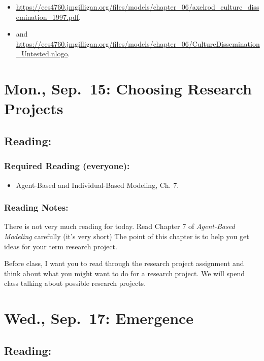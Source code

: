 \documentclass[
]{article}
\providecommand{\tightlist}{%
  \setlength{\itemsep}{0pt}\setlength{\parskip}{0pt}}
\begin{document}
\begin{itemize}
\tightlist
\item
  \url{https://ees4760.jmgilligan.org/files/models/chapter_06/axelrod_culture_dissemination_1997.pdf},
\item
  and
  \url{https://ees4760.jmgilligan.org/files/models/chapter_06/CultureDissemination_Untested.nlogo}.
\end{itemize}

\section{Mon., Sep.~15: Choosing Research
Projects}\label{mon.-sep.-15-choosing-research-projects}

\subsection{Reading:}\label{reading-7}

\subsubsection{Required Reading
(everyone):}\label{required-reading-everyone-6}

\begin{itemize}
\tightlist
\item
  Agent-Based and Individual-Based Modeling, Ch. 7.
\end{itemize}

\subsubsection{Reading Notes:}\label{reading-notes-6}

There is not very much reading for today. Read Chapter 7 of
\emph{Agent-Based Modeling} carefully (it's very short) The point of
this chapter is to help you get ideas for your term research project.

Before class, I want you to read through the research project assignment
and think about what you might want to do for a research project. We
will spend class talking about possible research projects.

\section{Wed., Sep.~17: Emergence}\label{wed.-sep.-17-emergence}

\subsection{Reading:}\label{reading-8}
\end{document}

